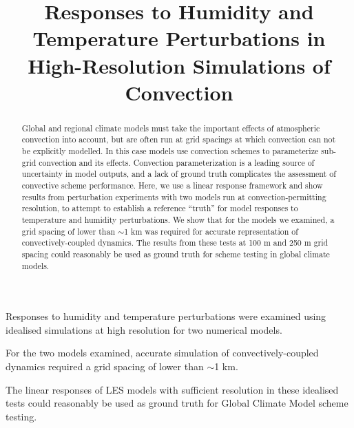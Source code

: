 \documentclass[draft]{agujournal2019}
\begin{document}
\title{Responses to Humidity and Temperature Perturbations in High-Resolution Simulations of Convection}




\begin{keypoints}
    \item Responses to humidity and temperature perturbations were examined
    using idealised simulations at high resolution for two numerical models.
    \item For the two models examined, accurate simulation of
    convectively-coupled dynamics required a grid spacing of lower than $\sim$1
    km.
    \item The linear responses of LES models with sufficient resolution in these
    idealised tests could reasonably be used as ground truth for Global Climate
    Model scheme testing.
\end{keypoints}

\justifying

\begin{abstract}
Global and regional climate models must take the important effects of
atmospheric convection into account, but are often run at grid spacings at which
convection can not be explicitly modelled. In this case models use convection
schemes to parameterize sub-grid convection and its effects. Convection
parameterization is a leading source of uncertainty in model outputs, and a lack
of ground truth complicates the assessment of convective scheme performance.
Here, we use a linear response framework and show results from perturbation
experiments with two models run at convection-permitting resolution, to attempt
to establish a reference ``truth'' for model responses to temperature and
humidity perturbations. We show that for the models we examined, a grid spacing
of lower than $\sim$1 km was required for accurate representation of
convectively-coupled dynamics. The results from these tests at 100 m and 250 m
grid spacing could reasonably be used as ground truth for scheme testing in
global climate models.
\end{abstract}
\end{document}
